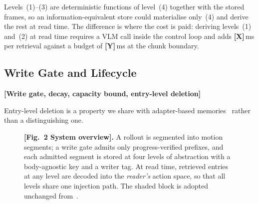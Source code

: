 \documentclass[letterpaper, 10 pt, conference]{ieeeconf}
\newcommand{\todo}[1]{\textbf{[#1]}}
\begin{document}
Levels~(1)--(3) are deterministic functions of level~(4) together with the stored
frames, so an information-equivalent store could materialise only~(4) and derive
the rest at read time. The difference is where the cost is paid: deriving
levels~(1) and~(2) at read time requires a VLM call inside the control loop and
adds \todo{X}\,ms per retrieval against a budget of \todo{Y}\,ms at the chunk
boundary.

\subsection{Write Gate and Lifecycle}
\label{sec:method:lifecycle}

\todo{Write gate, decay, capacity bound, entry-level deletion}

Entry-level deletion is a property we share with adapter-based
memories~\cite{clare} rather than a distinguishing one.

\begin{figure}[t]
  \centering
  \caption{\textbf{\todo{Fig.~2 System overview}.} A rollout is segmented into
  motion segments; a write gate admits only progress-verified prefixes, and each
  admitted segment is stored at four levels of abstraction with a body-agnostic
  key and a writer tag. At read time, retrieved entries at any level are decoded
  into the \emph{reader's} action space, so that all levels share one injection
  path. The shaded block is adopted unchanged from~\cite{rts}.
  }
  \label{fig:system}
\end{figure}
\end{document}
